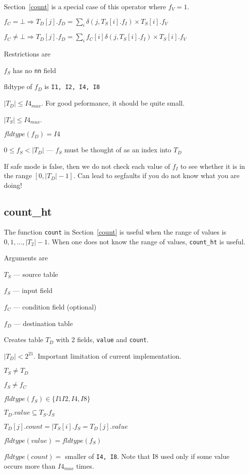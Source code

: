 \documentclass{report}
\begin{document}
Section~\ref{count} is a special case of this operator where \(f_V =
  1\).
\be
\item  \(f_C = \bot \Rightarrow 
T_D[j].f_D = \sum_i \delta(j, T_S[i].f_I) \times T_S[i].f_V\)
\item  \(f_C \neq \bot \Rightarrow 
T_D[j].f_D = \sum_i f_C[i] \delta(j, T_S[i].f_I) \times T_S[i].f_V\)
\ee

Restrictions are 
\be
\item \(f_S\) has no {\tt nn} field 
\item fldtype of \(f_D\) is {\tt I1, I2, I4, I8}
\item \(|T_D| \leq I4_{max}\). For good peformance, it should be quite small.
\item \(|T_S| \leq I4_{max}\). 
\item \(fldtype(f_D) = I4\)
\item \(0 \leq f_S < |T_D| \) --- \(f_S\) must be thought of as an
index into \(T_D\)
\item If safe mode is false, then we do not check each value of \(f_I\)
  to see whether it is in the range \([0, |T_D|-1]\). Can lead to
  segfaults if you do not know what you are doing!
\ee


\subsection{count\_ht}
\label{count_ht}

The function {\tt count} in Section~\ref{count} is useful when 
the range of values is \(0, 1, \ldots, |T_2|-1\). When one
does not know the range of values, \verb+count_ht+ is useful.

Arguments are 
\be
\item \(T_S\) --- source table
\item \(f_S\) --- input field 
\item \(f_C\) --- condition field  (optional)
\item \(f_D\) --- destination table
\ee

Creates table \(T_D\) with 2 fields, {\tt value} and {\tt count}.

\be
\item \(|T_D| < 2^{21}\). Important limitation of current implementation.
\item \(T_S \neq T_D\)
\item \(f_S \neq f_C\)
\item \(fldtype(f_S) \in \{I1 I2, I4, I8\}\)
\item \(T_D.value \subseteq T_S.f_S\)
\item \(T_D[j].count = |T_S[i].f_S = T_D[j].value\)
\item \(fldtype(value) = fldtype(f_S)\)
\item \(fldtype(count) = \) smaller of {\tt I4, I8}. Note that I8 used
only if some value occurs more than \(I4_{max}\) times.
\ee
\end{document}
